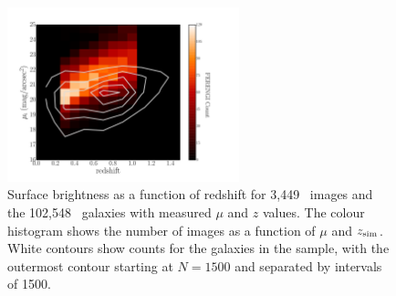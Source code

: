 \begin{figure}
\begin{center}
\includegraphics[width=0.6\textwidth]{figures/eye_of_sauron.pdf}
\caption{Surface brightness as a function of redshift for 3,449~\ferengi{}
images and the 102,548~\main{} galaxies with measured $\mu$ and $z$ values. The
colour histogram shows the number of \ferengi{} images as a function of $\mu$
and $z_{\rm sim}$. White contours show counts for the galaxies in the \main{}
sample, with the outermost contour starting at $N=1500$ and separated by
intervals of 1500.} 
\label{fig:eye_of_sauron}
\end{center}
\end{figure}


